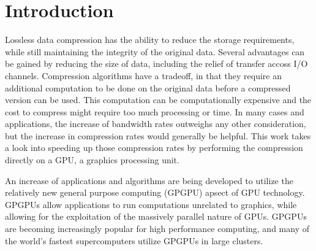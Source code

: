 \chapter{Introduction}
Lossless data compression has the ability to reduce the storage requirements, while still maintaining the integrity of the original data. Several advantages can be gained by reducing the size of data, including the relief of transfer accoss I/O channels. Compression algorithms have a tradeoff, in that they require an additional computation to be done on the original data before a compressed version can be used. This computation can be computationally expensive and the cost to compress might require too much processing or time. In many cases and applications, the increase of bandwidth rates outweighs any other consideration, but the increase in compression rates would generally be helpful. This work takes a look into speeding up those compression rates by performing the compression directly on a GPU, a graphics processing unit.

An increase of applications and algorithms are being developed to utilize the relatively new general purpose computing (GPGPU) apsect of GPU technology. GPGPUs allow applications to run computations unrelated to graphics, while allowing for the exploitation of the massively parallel nature of GPUs. GPGPUs are becoming increasingly popular for high performance computing, and many of the world's fastest supercomputers utilize GPGPUs in large clusters.

